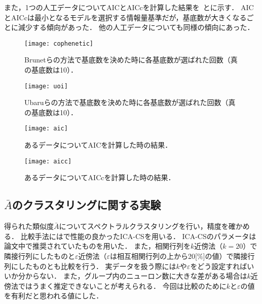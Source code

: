 また，1つの人工データについてAICとAICcを計算した結果を~とに示す．
AICとAICcは最小となるモデルを選択する情報量基準だが，基底数が大きくなるごとに減少する傾向があった．
他の人工データについても同様の傾向にあった．

\begin{figure}[htbp]
    \begin{minipage}{0.5\hsize}
        \begin{center}
            \texttt{[image: cophenetic]}
						\caption{Brunetらの方法で基底数を決めた時に各基底数が選ばれた回数（真の基底数は10）．}
            \label{fig:cophenetic}
        \end{center}
    \end{minipage}
    \begin{minipage}{0.5\hsize}
        \begin{center}
            \texttt{[image: uoi]}
						\caption{Ubaruらの方法で基底数を決めた時に各基底数が選ばれた回数（真の基底数は10）．}
            \label{fig:uoi}
        \end{center}
    \end{minipage}
\end{figure}
\begin{figure}[htbp]
    \begin{minipage}{0.5\hsize}
        \begin{center}
            \texttt{[image: aic]}
						\caption{あるデータについてAICを計算した時の結果．}
            \label{fig:aic}
        \end{center}
    \end{minipage}
    \begin{minipage}{0.5\hsize}
        \begin{center}
						\texttt{[image: aicc]}
						\caption{あるデータについてAICc\cite{Symonds2011}を計算した時の結果．}
            \label{fig:aicc}
        \end{center}
    \end{minipage}
\end{figure}

\subsection{$\bar{A}$のクラスタリングに関する実験}
得られた類似度$\bar{A}$についてスペクトラルクラスタリングを行い，精度を確かめる．
比較手法には\cite{Molter2018}で性能の良かったICA-CSを用いる．
ICA-CSのパラメータは論文中で推奨されていたものを用いた．
また，相関行列を$k$近傍法（$k=20$）で隣接行列にしたものと$\varepsilon$近傍法（$\varepsilon$は相互相関行列の上から20[\%]の値）で隣接行列にしたものとも比較を行う．
実データを扱う際には$k$や$\varepsilon$をどう設定すればいいか分からない．
また，グループ内のニューロン数に大きな差がある場合は$k$近傍法ではうまく推定できないことが考えられる．
今回は比較のために$k$と$\varepsilon$の値を有利だと思われる値にした．

